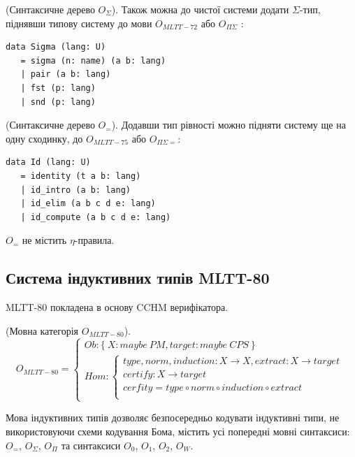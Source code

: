 \begin{definition} (Синтаксичне дерево $O_\Sigma$).
Також можна до чистої системи додати $\Sigma$-тип,
піднявши типову систему до мови $O_{MLTT-72}$ або $O_{\Pi\Sigma}$ :
\begin{lstlisting}[mathescape=true]
data Sigma (lang: U)
   = sigma (n: name) (a b: lang)
   | pair (a b: lang)
   | fst (p: lang)
   | snd (p: lang)
\end{lstlisting}
\end{definition}

\begin{definition} (Синтаксичне дерево $O_=$).
Додавши тип рівності можно підняти систему ще на одну сходинку,
до $O_{MLTT-75}$ або $O_{\Pi\Sigma=}$:
\begin{lstlisting}[mathescape=true]
data Id (lang: U)
   = identity (t a b: lang)
   | id_intro (a b: lang)
   | id_elim (a b c d e: lang)
   | id_compute (a b c d e: lang)
\end{lstlisting}
\end{definition}

$O_=$ не містить $\eta$-правила.

\newpage
\subsection{Система індуктивних типів MLTT-80}

MLTT-80 покладена в основу CCHM верифікатора.

\begin{definition} (Мовна категорія $O_{MLTT-80}$).
\begin{equation}
O_{MLTT-80} =
\begin{cases}
Ob: \{\ X: maybe\ PM, target: maybe\ CPS\ \} \\
Hom: \begin{cases}
type,norm,induction: X \rightarrow X, extract: X \rightarrow target \\
certify : X \rightarrow target \\
cerfity = type \circ norm \circ induction \circ extract \\
\end{cases}
\end{cases}
\end{equation}
\end{definition}

Мова індуктивних типів дозволяє безпосередньо кодувати індуктивні типи,
не використовуючи схеми кодування Бома, містить усі попередні мовні синтаксиси:
$O_=$, $O_\Sigma$, $O_\Pi$ та синтаксиси $O_0$, $O_1$, $O_2$, $O_W$.

